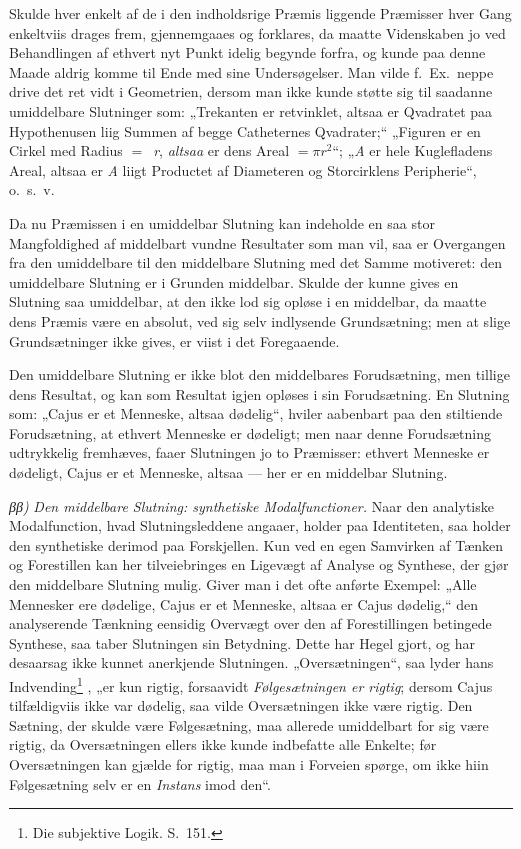 \documentclass[12pt]{book}
\newcommand{\opage}[1]{\marginnote{\footnotesize\textit{[#1]}}}
\begin{document}
Skulde hver enkelt af de i den indholdsrige Præmis liggende Præmisser hver Gang enkeltviis drages frem, gjennemgaaes og forklares, da maatte Videnskaben jo ved Behandlingen af ethvert nyt Punkt idelig begynde forfra, og kunde paa denne Maade aldrig komme til Ende med sine
\opage{312}Undersøgelser. Man vilde f.\ Ex.\ neppe drive det ret vidt i Geometrien, dersom man ikke kunde støtte sig til saadanne umiddelbare Slutninger som: „Trekanten er retvinklet, altsaa er Qvadratet paa Hypothenusen liig Summen af begge Catheternes Qvadrater;“ „Figuren er en Cirkel med Radius $=$~\textit{r}, \emph{altsaa} er dens Areal $= \pi r^2$“; „\textit{A} er hele Kuglefladens Areal, altsaa er \textit{A} liigt Productet af Diameteren og Storcirklens Peripherie“, o.\ s.\ v.

Da nu Præmissen i en umiddelbar Slutning kan indeholde en saa stor Mangfoldighed af middelbart vundne Resultater som man vil, saa er Overgangen fra den umiddelbare til den middelbare Slutning med det Samme motiveret: den umiddelbare Slutning er i Grunden middelbar. Skulde der kunne gives en Slutning saa umiddelbar, at den ikke lod sig opløse i en middelbar, da maatte dens Præmis være en absolut, ved sig selv indlysende Grundsætning; men at slige Grundsætninger ikke gives, er viist i det Foregaaende.

Den umiddelbare Slutning er ikke blot den middelbares Forudsætning, men tillige dens Resultat, og kan som Resultat igjen opløses i sin Forudsætning. En Slutning som: „Cajus er et Menneske, altsaa dødelig“, hviler aabenbart paa den stiltiende Forudsætning, at ethvert Menneske er dødeligt; men naar denne Forudsætning udtrykkelig fremhæves, faaer Slutningen jo to Præmisser: ethvert Menneske er dødeligt, Cajus er et Menneske, altsaa --- her er en middelbar Slutning.

\textit{ββ)} \emph{Den middelbare Slutning: synthetiske Modalfunctioner.} Naar den analytiske Modalfunction, hvad Slutningsleddene angaaer, holder paa Identiteten, saa holder den synthetiske derimod paa Forskjellen. Kun ved en egen Samvirken af Tænken og Forestillen kan her tilveiebringes en Ligevægt af Analyse og Synthese, der gjør den middelbare Slutning mulig. Giver man i det ofte anførte Exempel: „Alle Mennesker ere dødelige, Cajus er et Menneske, altsaa er Cajus dødelig,“ den analyserende Tænkning eensidig
\opage{313}Overvægt over den af Forestillingen betingede Synthese, saa taber Slutningen sin Betydning. Dette har Hegel gjort, og har desaarsag ikke kunnet anerkjende Slutningen. „Oversætningen“, saa lyder hans Indvending\footnote{Die subjektive Logik. S.~151.}%
, „er kun rigtig, forsaavidt \emph{Følgesætningen er rigtig}; dersom Cajus tilfældigviis ikke var dødelig, saa vilde Oversætningen ikke være rigtig. Den Sætning, der skulde være Følgesætning, maa allerede umiddelbart for sig være rigtig, da Oversætningen ellers ikke kunde indbefatte alle Enkelte; før%
{} Oversætningen kan gjælde for rigtig, maa man i Forveien spørge, om ikke hiin Følgesætning selv er en \emph{Instans} imod den“.
\end{document}
